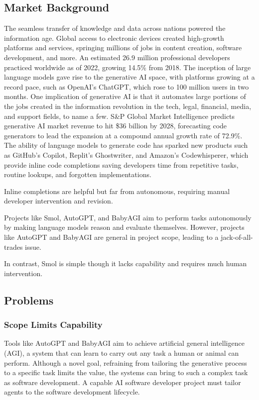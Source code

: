 \documentclass[a4paper,twocolumn,11pt]{quantumarticle}
\begin{document}
\subsection{Market Background}
The seamless transfer of knowledge and data across nations powered the information age. Global access to electronic devices created high-growth platforms and services, springing millions of jobs in content creation, software development, and more. An estimated 26.9 million professional developers practiced worldwide as of 2022, growing 14.5\% from 2018\cite{Qubit2022How}. The inception of large language models gave rise to the generative AI space, with platforms growing at a record pace, such as OpenAI's ChatGPT, which rose to 100 million users in two months\cite{Carr2023ChatGPT}. One implication of generative AI is that it automates large portions of the jobs created in the information revolution in the tech, legal, financial, media, and support fields, to name a few\cite{Mok2023ChatGPT}. S\&P Global Market Intelligence predicts generative AI market revenue to hit \$36 billion by 2028, forecasting code generators to lead the expansion at a compound annual growth rate of 72.9\%\cite{Park2023Generative}. The ability of language models to generate code has sparked new products such as GitHub's Copilot\cite{Dohmke2022GitHub}, Replit's Ghostwriter\cite{Masad2022Ghostwriter}, and Amazon's Codewhisperer\cite{Engdahl2023Amazon}, which provide inline code completions saving developers time from repetitive tasks, routine lookups, and forgotten implementations.

Inline completions are helpful but far from autonomous, requiring manual developer intervention and revision.

Projects like Smol\cite{Osika2023Current}, AutoGPT\cite{Ortiz2023What}, and BabyAGI\cite{Parthasarathy2023Meet} aim to perform tasks autonomously by making language models reason and evaluate themselves. However, projects like AutoGPT and BabyAGI are general in project scope, leading to a jack-of-all-trades issue.

In contrast, Smol is simple though it lacks capability and requires much human intervention.

\subsection{Problems}
\subsubsection{Scope Limits Capability}
Tools like AutoGPT and BabyAGI aim to achieve artificial general intelligence (AGI), a system that can learn to carry out any task a human or animal can perform\cite{Bubeck2023Sparks}. Although a novel goal, refraining from tailoring the generative process to a specific task limits the value, the systems can bring to such a complex task as software development. A capable AI software developer project must tailor agents to the software development lifecycle.
\end{document}
